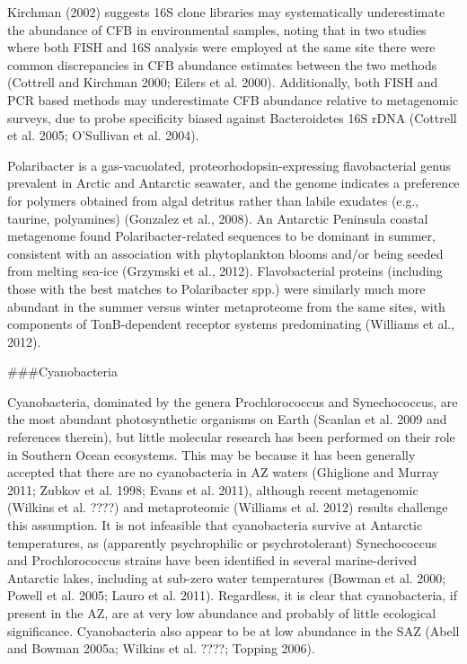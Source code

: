 Kirchman (2002) suggests 16S clone libraries may systematically underestimate the abundance of CFB in environmental samples, noting that in two studies where both FISH and 16S analysis were employed at the same site there were common discrepancies in CFB abundance estimates between the two methods (Cottrell and Kirchman 2000; Eilers et al. 2000). Additionally, both FISH and PCR based methods may underestimate CFB abundance relative to metagenomic surveys, due to probe specificity biased against Bacteroidetes 16S rDNA (Cottrell et al. 2005; O'Sullivan et al. 2004).

Polaribacter is a gas-vacuolated, proteorhodopsin-expressing flavobacterial genus prevalent in Arctic and Antarctic seawater, and the genome indicates a preference for polymers obtained from algal detritus rather than labile exudates (e.g., taurine, polyamines) (Gonzalez et al., 2008). An Antarctic Peninsula coastal metagenome found Polaribacter-related sequences to be dominant in summer, consistent with an association with phytoplankton blooms and/or being seeded from melting sea-ice (Grzymski et al., 2012). Flavobacterial proteins (including those with the best matches to Polaribacter spp.) were similarly much more abundant in the summer versus winter metaproteome from the same sites, with components of TonB-dependent receptor systems predominating (Williams et al., 2012). 

###Cyanobacteria

Cyanobacteria, dominated by the genera Prochlorococcus and Synechococcus, are the most abundant photosynthetic organisms on Earth (Scanlan et al. 2009 and references therein), but little molecular research has been performed on their role in Southern Ocean ecosystems. This may be because it has been generally accepted that there are no cyanobacteria in AZ waters (Ghiglione and Murray 2011; Zubkov et al. 1998; Evans et al. 2011), although recent metagenomic (Wilkins et al. ????) and metaproteomic (Williams et al. 2012) results challenge this assumption. It is not infeasible that cyanobacteria survive at Antarctic temperatures, as (apparently psychrophilic or psychrotolerant) Synechococcus and Prochlorococcus strains have been identified in several marine-derived Antarctic lakes, including at sub-zero water temperatures (Bowman et al. 2000; Powell et al. 2005; Lauro et al. 2011). Regardless, it is clear that cyanobacteria, if present in the AZ, are at very low abundance and probably of little ecological significance. Cyanobacteria also appear to be at low abundance in the SAZ (Abell and Bowman 2005a; Wilkins et al. ????; Topping 2006).  



